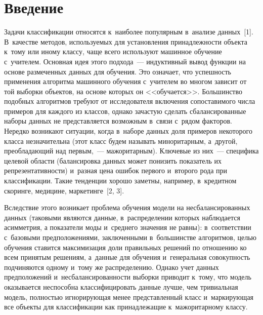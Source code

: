   
\vspace*{6pt}



\thispagestyle{headings}

\begin{multicols}{2}

\label{st\stat}
  
\section{Введение}

  Задачи классификации относятся к~наиболее популярным в~анализе 
данных~[1]. В~качестве методов, используемых для установления 
принадлежности объекта к~тому или иному классу, чаще всего используют 
машинное обучение с~учителем. Основная идея этого подхода~--- индуктивный 
вывод функции на основе размеченных данных для обучения. Это означает, что 
успешность применения алгоритма машинного обучения с~учителем во многом 
зависит от той выборки объектов, на основе которых он <<обучается>>. 
Большинство подобных алгоритмов требуют от исследователя включения 
сопоставимого числа примеров для каждого из классов, однако зачастую 
сделать сбалансированные наборы данных не представляется возможным 
в~связи с~рядом факторов. Нередко возникают ситуации, когда в~наборе 
данных доля примеров некоторого класса незначительна (этот класс будем 
называть миноритарным, а~другой, пре\-об\-ла\-да\-ющий над первым,~--- 
мажоритарным). Ключевые из них~--- специфика целевой области 
(балансировка данных может понизить показатель их репрезентативности) 
и~разная цена ошибок первого и~второго рода при классификации. Такие 
тенденции хорошо заметны, например, в~кредитном скоринге, медицине, 
маркетинге~[2, 3].  
  
  Вследствие этого возникает проблема обучения модели на 
несбалансированных данных (таковыми являются данные, в~распределении 
которых наблюдается асимметрия, а показатели моды и~среднего значения не 
равны): в~соответствии с~базовыми предположениями, заключенными 
в~большинстве алгоритмов, целью обучения ставится максимизация доли 
правильных решений по отношению ко всем принятым решениям, а~данные 
для обучения и~генеральная совокупность подчиняются одному и~тому же 
распределению. Однако учет данных предположений и~несбалансированности 
выборки приводит к~тому, что модель оказывается неспособна 
классифицировать данные лучше, чем тривиальная модель, полностью 
игнорирующая менее представленный класс и~маркирующая все объекты для 
классификации как принадлежащие к~мажоритарному классу.
  

\end{multicols}
